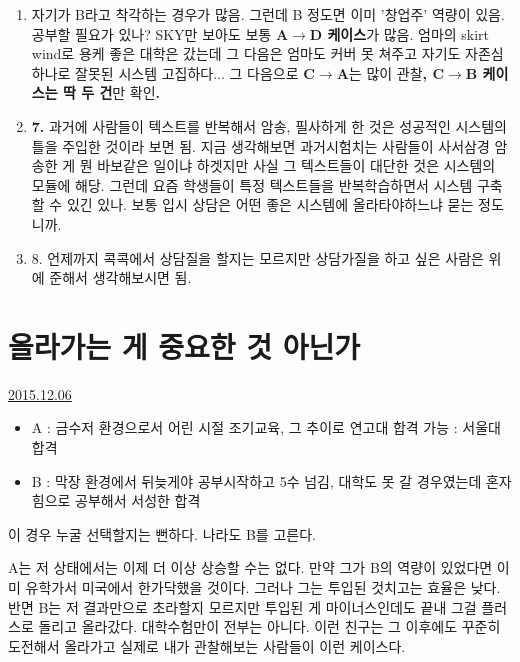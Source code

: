 \begin{enumerate}
    \item 자기가 B라고 착각하는 경우가 많음. 그런데 B 정도면 이미 '창업주' 역량이 있음. 공부할 필요가 있나?
    SKY만 보아도 보통 \textbf{A$\rightarrow$D 케이스}가 많음.
    엄마의 skirt wind로 용케 좋은 대학은 갔는데 그 다음은 엄마도 커버 못 쳐주고 자기도 자존심 하나로 잘못된 시스템 고집하다...
    그 다음으로 \textbf{C$\rightarrow$A}는 많이 관찰\textbf{, C$\rightarrow$B 케이스는 딱 두 건}만 확인\textbf{.}
    \vspace{5mm}

    \item \textbf{7.} 과거에 사람들이 텍스트를 반복해서 암송, 필사하게 한 것은 성공적인 시스템의 틀을 주입한 것이라 보면 됨.
    지금 생각해보면 과거시험치는 사람들이 사서삼경 암송한 게 뭔 바보같은 일이냐 하겟지만
    사실 그 텍스트들이 대단한 것은 시스템의 모듈에 해당.
    그런데 요즘 학생들이 특정 텍스트들을 반복학습하면서 시스템 구축할 수 있긴 있나.
    보통 입시 상담은 어떤 좋은 시스템에 올라타야하느냐 묻는 정도니까.
    \vspace{5mm}

    \item 8. 언제까지 콕콕에서 상담질을 할지는 모르지만 상담가질을 하고 싶은 사람은 위에 준해서 생각해보시면 됨.
    \vspace{5mm}

\end{enumerate}


\section{올라가는 게 중요한 것 아닌가}
\href{https://www.kockoc.com/Apoc/529739}{2015.12.06}

\vspace{5mm}
\begin{itemize}
    \item[] A : 금수저 환경으로서 어린 시절 조기교육, 그 추이로 연고대 합격 가능 : 서울대 합격
    \item[] B : 막장 환경에서 뒤늦게야 공부시작하고 5수 넘김, 대학도 못 갈 경우였는데 혼자 힘으로 공부해서 서성한 합격
\end{itemize}
\vspace{5mm}

이 경우 누굴 선택할지는 뻔하다. 나라도 B를 고른다.
\vspace{5mm}

A는 저 상태에서는 이제 더 이상 상승할 수는 없다. 만약 그가 B의 역량이 있었다면 이미 유학가서 미국에서 한가닥했을 것이다.
그러나 그는 투입된 것치고는 효율은 낮다.
반면 B는 저 결과만으로 초라할지 모르지만 투입된 게 마이너스인데도 끝내 그걸 플러스로 돌리고 올라갔다.
대학수험만이 전부는 아니다. 이런 친구는 그 이후에도 꾸준히 도전해서 올라가고 실제로 내가 관찰해보는 사람들이 이런 케이스다.
\vspace{5mm}

